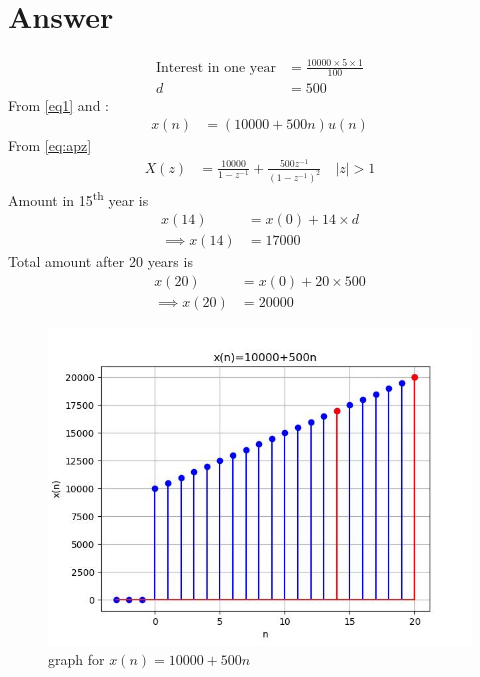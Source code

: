 \documentclass[journal,12pt,twocolumn]{IEEEtran}
\theoremstyle{remark}
\begin{document}
\section*{Answer}

\begin{align}
\text{Interest in one year} &= \frac{10000\times5\times1}{100}\\    
    d &= 500\label{eq1}
\end{align}
From \eqref{eq1} and :
    \begin{align}
        x(n) &= (10000 + 500n)u(n)
    \end{align}
From \eqref{eq:apz}
    \begin{align}
        X(z) &= \frac{10000}{1-z^{-1}} + \frac{500z^{-1}}{(1-z^{-1})^2} \quad |z|>1
    \end{align}
Amount in 15\textsuperscript{th} year is
    \begin{align}
        x(14) &= x(0) + 14\times d\\
        \implies x(14) &= 17000
    \end{align}
Total amount after 20 years is
    \begin{align}
        x(20) &= x(0) + 20\times 500\\
        \implies x(20) &= 20000
    \end{align}
    \begin{figure}[h]
    \renewcommand\thefigure{1}
        \centering
        \includegraphics[width=1\linewidth]{figs/p.jpeg}
        \caption{graph for $x(n) = 10000 + 500n$}
        \label{graph}
    \end{figure}
\end{document}
